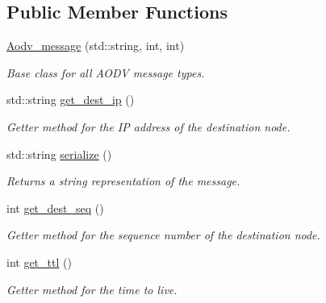 \subsection*{Public Member Functions}
\begin{DoxyCompactItemize}
\item 
\hyperlink{class_aodv__message_a0a2b1d41e31790c8c7ee6b1f4696d111}{Aodv\+\_\+message} (std\+::string, int, int)\hypertarget{class_aodv__message_a0a2b1d41e31790c8c7ee6b1f4696d111}{}\label{class_aodv__message_a0a2b1d41e31790c8c7ee6b1f4696d111}

\begin{DoxyCompactList}\small\item\em Base class for all A\+O\+DV message types. \end{DoxyCompactList}\item 
std\+::string \hyperlink{class_aodv__message_ae3237227c6cfe4ef060954b9ee8583ba}{get\+\_\+dest\+\_\+ip} ()\hypertarget{class_aodv__message_ae3237227c6cfe4ef060954b9ee8583ba}{}\label{class_aodv__message_ae3237227c6cfe4ef060954b9ee8583ba}

\begin{DoxyCompactList}\small\item\em Getter method for the IP address of the destination node. \end{DoxyCompactList}\item 
std\+::string \hyperlink{class_aodv__message_ad781f3f00c64bc2f1f9767d2a1154af3}{serialize} ()\hypertarget{class_aodv__message_ad781f3f00c64bc2f1f9767d2a1154af3}{}\label{class_aodv__message_ad781f3f00c64bc2f1f9767d2a1154af3}

\begin{DoxyCompactList}\small\item\em Returns a string representation of the message. \end{DoxyCompactList}\item 
int \hyperlink{class_aodv__message_a492730e2bac77ae381c5a3b50f6fe7c5}{get\+\_\+dest\+\_\+seq} ()\hypertarget{class_aodv__message_a492730e2bac77ae381c5a3b50f6fe7c5}{}\label{class_aodv__message_a492730e2bac77ae381c5a3b50f6fe7c5}

\begin{DoxyCompactList}\small\item\em Getter method for the sequence number of the destination node. \end{DoxyCompactList}\item 
int \hyperlink{class_aodv__message_aebdbe5f76bb29cb30d2bb5d739644485}{get\+\_\+ttl} ()\hypertarget{class_aodv__message_aebdbe5f76bb29cb30d2bb5d739644485}{}\label{class_aodv__message_aebdbe5f76bb29cb30d2bb5d739644485}

\begin{DoxyCompactList}\small\item\em Getter method for the time to live. \end{DoxyCompactList}\end{DoxyCompactItemize}
